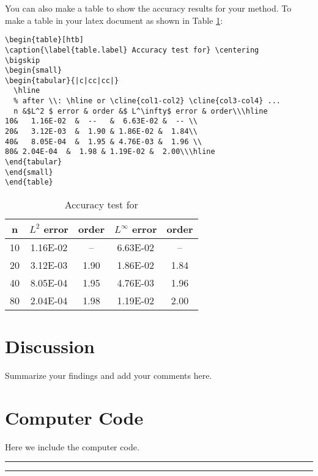 \documentclass{article}
\begin{document}
You can also make a table to show the accuracy results for your
method. To make a table in your latex document as shown in Table
\ref{table.label}:
\begin{verbatim}
\begin{table}[htb]
\caption{\label{table.label} Accuracy test for} \centering
\bigskip
\begin{small}
\begin{tabular}{|c|cc|cc|}
  \hline
  % after \\: \hline or \cline{col1-col2} \cline{col3-col4} ...
  n &$L^2 $ error & order &$ L^\infty$ error & order\\\hline
10&   1.16E-02  &  --   &  6.63E-02 &  -- \\
20&   3.12E-03  &  1.90 & 1.86E-02 &  1.84\\
40&   8.05E-04  &  1.95 & 4.76E-03 &  1.96 \\
80& 2.04E-04  &  1.98 & 1.19E-02 &  2.00\\\hline
\end{tabular}
\end{small}
\end{table}
\end{verbatim}

\begin{table}[htb]
\caption{\label{table.label} Accuracy test for} \centering
\bigskip
\begin{small}
\begin{tabular}{|c|cc|cc|}
  \hline
  n &$L^2 $ error & order &$ L^\infty$ error & order\\\hline
10&   1.16E-02  &  --   &  6.63E-02 &  -- \\
20&   3.12E-03  &  1.90 & 1.86E-02 &  1.84\\
40&   8.05E-04  &  1.95 & 4.76E-03 &  1.96 \\
80& 2.04E-04  &  1.98 & 1.19E-02 &  2.00 \\\hline
\end{tabular}
\end{small}
\end{table}
\section{Discussion}

Summarize your findings and add your comments here.

\appendix
\section{Computer Code}

Here we include the computer code.

\small \hrule  \hrule
\end{document}
